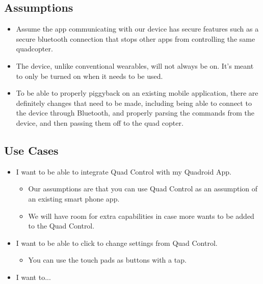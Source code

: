 \documentclass[12pt,letterpaper]{article}
\begin{document}
\subsection*{Assumptions}
\begin{itemize}
\item Assume the app communicating with our device has secure features such as a secure bluetooth connection that stops other apps from controlling the same quadcopter. 
\item The device, unlike conventional wearables, will not always be on. It’s meant to only be turned on when it needs to be used. 
\item To be able to properly piggyback on an existing  mobile application, there are definitely changes that need to be made, including being able to connect to the device through Bluetooth, and properly parsing the commands from the device, and then passing them off to the quad copter.
\end{itemize}

\subsection*{Use Cases}
\begin{itemize}
\item I want to be able to integrate Quad Control with my Quadroid App.
\begin{itemize}
\item Our assumptions are that you can use Quad Control as an assumption of an existing smart phone app.
\item We will have room for extra capabilities in case more wants to be added to the Quad Control.
\end{itemize}
\item I want to be able to click to change settings from Quad Control.
\begin{itemize}
\item You can use the touch pads as buttons with a tap.
\end{itemize}
\item I want to...
\end{itemize}
\end{document}
